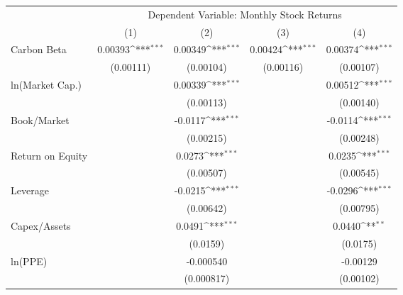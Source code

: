 {
\def\sym#1{\ifmmode^{#1}\else\(^{#1}\)\fi}
\begin{tabular}{l*{4}{c}}
\hline\hline
                    &\multicolumn{4}{c}{Dependent Variable: Monthly Stock Returns}                          \\\cmidrule(lr){2-5}
                    &\multicolumn{1}{c}{(1)}         &\multicolumn{1}{c}{(2)}         &\multicolumn{1}{c}{(3)}         &\multicolumn{1}{c}{(4)}         \\
\hline
Carbon Beta         &     0.00393\sym{***}&     0.00349\sym{***}&     0.00424\sym{***}&     0.00374\sym{***}\\
                    &   (0.00111)         &   (0.00104)         &   (0.00116)         &   (0.00107)         \\
ln(Market Cap.)     &                     &     0.00339\sym{***}&                     &     0.00512\sym{***}\\
                    &                     &   (0.00113)         &                     &   (0.00140)         \\
Book/Market         &                     &     -0.0117\sym{***}&                     &     -0.0114\sym{***}\\
                    &                     &   (0.00215)         &                     &   (0.00248)         \\
Return on Equity    &                     &      0.0273\sym{***}&                     &      0.0235\sym{***}\\
                    &                     &   (0.00507)         &                     &   (0.00545)         \\
Leverage            &                     &     -0.0215\sym{***}&                     &     -0.0296\sym{***}\\
                    &                     &   (0.00642)         &                     &   (0.00795)         \\
Capex/Assets        &                     &      0.0491\sym{***}&                     &      0.0440\sym{**} \\
                    &                     &    (0.0159)         &                     &    (0.0175)         \\
ln(PPE)             &                     &   -0.000540         &                     &    -0.00129         \\
                    &                     &  (0.000817)         &                     &   (0.00102)         \\

\end{tabular}}

